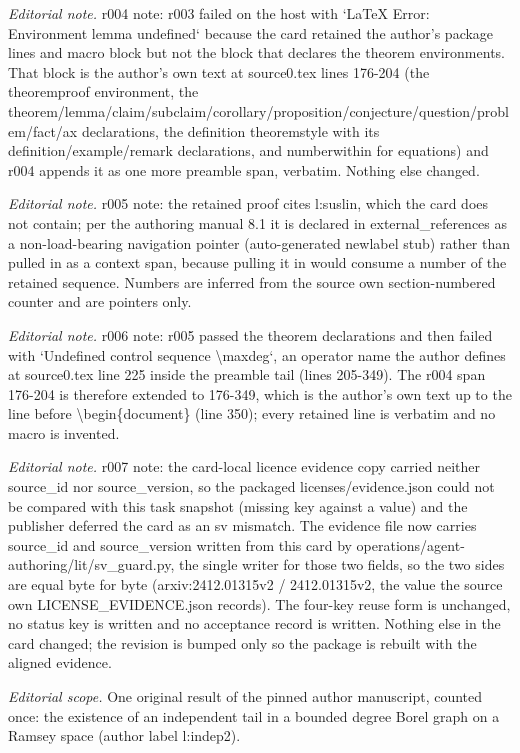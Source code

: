 \documentclass[10pt,a4paper]{article}
\theoremstyle{definition}
\numberwithin{equation}{section}
\begin{document}
\noindent\textit{Editorial note.} r004 note: r003 failed on the host with `LaTeX Error: Environment lemma undefined` because the card retained the author's package lines and macro block but not the block that declares the theorem environments. That block is the author's own text at source0.tex lines 176-204 (the theoremproof environment, the theorem/lemma/claim/subclaim/corollary/proposition/conjecture/question/problem/fact/ax declarations, the definition theoremstyle with its definition/example/remark declarations, and numberwithin for equations) and r004 appends it as one more preamble span, verbatim. Nothing else changed.\par\medskip
\noindent\textit{Editorial note.} r005 note: the retained proof cites l:suslin, which the card does not contain; per the authoring manual 8.1 it is declared in external\_references as a non-load-bearing navigation pointer (auto-generated newlabel stub) rather than pulled in as a context span, because pulling it in would consume a number of the retained sequence. Numbers are inferred from the source own section-numbered counter and are pointers only.\par\medskip
\noindent\textit{Editorial note.} r006 note: r005 passed the theorem declarations and then failed with `Undefined control sequence \textbackslash{}maxdeg`, an operator name the author defines at source0.tex line 225 inside the preamble tail (lines 205-349). The r004 span 176-204 is therefore extended to 176-349, which is the author's own text up to the line before \textbackslash{}begin\{document\} (line 350); every retained line is verbatim and no macro is invented.\par\medskip
\noindent\textit{Editorial note.} r007 note: the card-local licence evidence copy carried neither source\_id nor source\_version, so the packaged licenses/evidence.json could not be compared with this task snapshot (missing key against a value) and the publisher deferred the card as an sv mismatch. The evidence file now carries source\_id and source\_version written from this card by operations/agent-authoring/lit/sv\_guard.py, the single writer for those two fields, so the two sides are equal byte for byte (arxiv:2412.01315v2 / 2412.01315v2, the value the source own LICENSE\_EVIDENCE.json records). The four-key reuse form is unchanged, no status key is written and no acceptance record is written. Nothing else in the card changed; the revision is bumped only so the package is rebuilt with the aligned evidence.\par\medskip
\noindent\textit{Editorial scope.} One original result of the pinned author manuscript, counted once: the existence of an independent tail in a bounded degree Borel graph on a Ramsey space (author label l:indep2).\par\medskip
\end{document}
